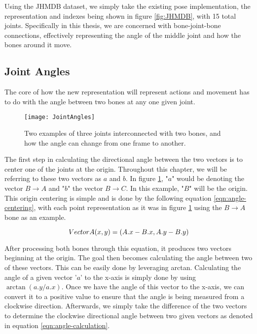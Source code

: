 Using the JHMDB dataset, we simply take the existing pose implementation, the representation and indexes being shown in figure \ref{fig:JHMDB}, with 15 total joints. Specifically in this thesis, we are concerned with bone-joint-bone connections, effectively representing the angle of the middle joint and how the bones around it move.

\subsection{Joint Angles}

The core of how the new representation will represent actions and movement has to do with the angle between two bones at any one given joint.

\begin{figure}[ht]
	\texttt{[image: JointAngles]}
	\centering
	\caption{Two examples of three joints interconnected with two bones, and how the angle can change from one frame to another.}
	\label{fig:joint-angles}
\end{figure}

The first step in calculating the directional angle between the two vectors is to center one of the joints at the origin. Throughout this chapter, we will be referring to these two vectors as $a$ and $b$. In figure \ref{fig:joint-angles}, "$a$" would be denoting the vector $B \rightarrow A$ and "$b$" the vector $B \rightarrow C$. In this example, "$B$" will be the origin. This origin centering is simple and is done by the following equation \ref{eqn:angle-centering}, with each point representation as it was in figure \ref{fig:joint-angles} using the $B \rightarrow A$ bone as an example.

\begin{equation}
	\label{eqn:angle-centering}
	\centering
	VectorA(x,y) = (A.x - B.x, A.y - B.y)
\end{equation}

After processing both bones through this equation, it produces two vectors beginning at the origin. The goal then becomes calculating the angle between two of these vectors. This can be easily done by leveraging arctan. Calculating the angle of a given vector '$a$' to the x-axis is simply done by using $\arctan(a.y/a.x)$. Once we have the angle of this vector to the x-axis, we can convert it to a positive value to ensure that the angle is being measured from a clockwise direction. Afterwards, we simply take the difference of the two vectors to determine the clockwise directional angle between two given vectors as denoted in equation \ref{eqn:angle-calculation}.

